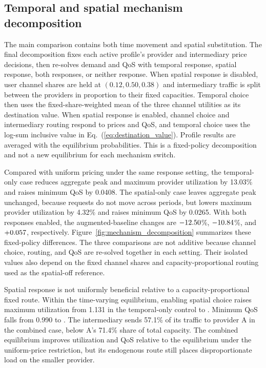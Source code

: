 \documentclass[11pt,a4paper]{article}
\begin{document}
\subsection{Temporal and spatial mechanism decomposition}

The main comparison contains both time movement and spatial substitution. The final decomposition fixes each active profile's provider and intermediary price decisions, then re-solves demand and QoS with temporal response, spatial response, both responses, or neither response. When spatial response is disabled, user channel shares are held at $(0.12,0.50,0.38)$ and intermediary traffic is split between the providers in proportion to their fixed capacities. Temporal choice then uses the fixed-share-weighted mean of the three channel utilities as its destination value. When spatial response is enabled, channel choice and intermediary routing respond to prices and QoS, and temporal choice uses the log-sum inclusive value in Eq.~(\ref{eq:destination_value}). Profile results are averaged with the equilibrium probabilities. This is a fixed-policy decomposition and not a new equilibrium for each mechanism switch.

Compared with uniform pricing under the same response setting, the temporal-only case reduces aggregate peak and maximum provider utilization by 13.03\% and raises minimum QoS by 0.0408. The spatial-only case leaves aggregate peak unchanged, because requests do not move across periods, but lowers maximum provider utilization by 4.32\% and raises minimum QoS by 0.0265. With both responses enabled, the augmented-baseline changes are $-12.50$\%, $-10.84$\%, and $+0.057$, respectively. Figure~\ref{fig:mechanism_decomposition} summarizes these fixed-policy differences. The three comparisons are not additive because channel choice, routing, and QoS are re-solved together in each setting. Their isolated values also depend on the fixed channel shares and capacity-proportional routing used as the spatial-off reference.

Spatial response is not uniformly beneficial relative to a capacity-proportional fixed route. Within the time-varying equilibrium, enabling spatial choice raises maximum utilization from 1.131 in the temporal-only control to \DynamicMaximumUtilisation{}. Minimum QoS falls from 0.990 to \DynamicMinimumQoS{}. The intermediary sends 57.1\% of its traffic to provider A in the combined case, below A's 71.4\% share of total capacity. The combined equilibrium improves utilization and QoS relative to the equilibrium under the uniform-price restriction, but its endogenous route still places disproportionate load on the smaller provider.
\end{document}
